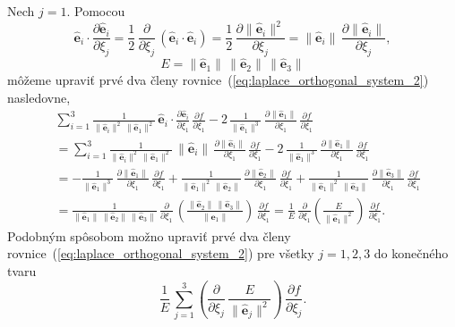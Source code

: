 \documentclass[a4paper, 12pt]{book}
\let\vec\mathbf
\begin{document}
Nech $j = 1$.  Pomocou
%
\begin{equation}
\hat{\vec e}_i \cdot \frac{\partial \hat{\vec e}_i}{\partial \xi_j} 
= \frac{1}{2} \, \frac{\partial}{\partial \xi_j} \, \left( \hat{\vec e}_i \cdot 
\hat{\vec e}_i \right) = \frac{1}{2} \, \frac{\partial \| \hat{\vec e}_i 
\|^2}{\partial \xi_j} = \| \hat{\vec e}_i \| \, \frac{\partial \| \hat{\vec 
e}_i \|}{\partial \xi_j}{,}
\end{equation}
%
\begin{equation}
\label{eq:e_laplace}
E = \| \hat{\vec e}_1  \| \, \| \hat{\vec e}_2  \| \, \| \hat{\vec e}_3  \|
\end{equation}
%
môžeme upraviť prvé dva členy rovnice~(\ref{eq:laplace_orthogonal_system_2}) 
nasledovne,
%
\begin{equation}
\label{eq:laplace_orthogonal_system_two_terms}
\begin{split}
&\sum_{i = 1}^{3} \frac{1}{\| \hat{\vec e}_i \|^2 \, \| \hat{\vec e}_1 \|^2} \, 
\hat{\vec e}_i \cdot \frac{\partial \hat{\vec e}_i}{\partial \xi_1} \, 
\frac{\partial f}{\partial \xi_1}
- 2\, \frac{1}{\|\hat{\vec e}_1 \|^3} \, \frac{\partial \| \hat{\vec e}_1 
\|}{\partial \xi_1} \, \frac{\partial f}{\partial \xi_1}\\
%
&= \sum_{i = 1}^{3} \frac{1}{\| \hat{\vec e}_i \|^2 \, \| \hat{\vec e}_1 \|^2} 
\, \| \hat{\vec e}_i \| \, \frac{\partial \| \hat{\vec e}_i \|}{\partial \xi_1} 
\, \frac{\partial f}{\partial \xi_1}
- 2\, \frac{1}{\|\hat{\vec e}_1 \|^3} \, \frac{\partial \| \hat{\vec e}_1 
\|}{\partial \xi_1} \, \frac{\partial f}{\partial \xi_1}\\
%
&= -\frac{1}{\| \hat{\vec e}_1 \|^3} \, \frac{\partial \| \hat{\vec e}_1 
\|}{\partial \xi_1} \, \frac{\partial f}{\partial \xi_1} + \frac{1}{\| 
\hat{\vec e}_1 \|^2 \, \| \hat{\vec e}_2 \|} \, \frac{\partial \| \hat{\vec 
e}_2 \|}{\partial \xi_1} \, \frac{\partial f}{\partial \xi_1} + \frac{1}{\| 
\hat{\vec e}_1 \|^2 \, \| \hat{\vec e}_3 \|} \, \frac{\partial \| \hat{\vec 
e}_3 \|}{\partial \xi_1} \, \frac{\partial f}{\partial \xi_1}\\
%
&= \frac{1}{\| \hat{\vec e}_1 \| \, \| \hat{\vec e}_2 \| \, \| \hat{\vec e}_3 
\|} \, \frac{\partial}{\partial \xi_1} \, \left( \frac{\| \hat{\vec e}_2 \| \, 
\| \hat{\vec e}_3 \|}{\| \hat{\vec e}_1 \|} \right) \, \frac{\partial 
f}{\partial \xi_1} = \frac{1}{E} \, \frac{\partial}{\partial \xi_1} \left( 
\frac{E}{\| \hat{\vec e}_1 \|^2} \right) \, \frac{\partial f}{\partial 
\xi_1}{.}
\end{split}
\end{equation}
%
Podobným spôsobom možno upraviť prvé dva členy 
rovnice~(\ref{eq:laplace_orthogonal_system_2}) pre všetky $j = 1, 2, 3$ do 
konečného tvaru
%
\begin{equation}
\label{eq:laplace_orthogonal_system_two_terms_final}
\frac{1}{E} \, \sum_{j = 1}^3 \left( \frac{\partial}{\partial \xi_j} \, 
\frac{E}{\| \hat{\vec e}_j \|^2}\right) \, \frac{\partial f}{\partial \xi_j}{.}
\end{equation}
\end{document}
